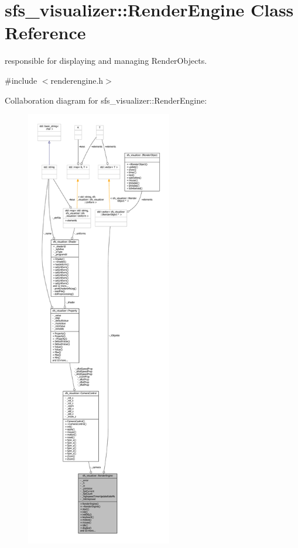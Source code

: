 \section{sfs\-\_\-visualizer\-:\-:Render\-Engine Class Reference}
\label{classsfs__visualizer_1_1RenderEngine}


responsible for displaying and managing Render\-Objects.  




{\ttfamily \#include $<$renderengine.\-h$>$}



Collaboration diagram for sfs\-\_\-visualizer\-:\-:Render\-Engine\-:\nopagebreak
\begin{figure}[H]
\begin{center}
\leavevmode
\includegraphics[height=550pt]{d9/d96/classsfs__visualizer_1_1RenderEngine__coll__graph}
\end{center}
\end{figure}
